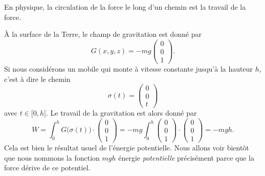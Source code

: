En physique, la circulation de la force le long d'un chemin est la travail de la force.

\begin{example}
    À la surface de la Terre, le champ de gravitation est donné par
    \begin{equation}
        G(x,y,z)=-mg\begin{pmatrix}
            0    \\
            0    \\
            1
        \end{pmatrix}.
    \end{equation}
    Si nous considérons un mobile qui monte à vitesse constante jusqu'à la hauteur $h$, c'est à dire le chemin
    \begin{equation}
        \sigma(t)=\begin{pmatrix}
            0    \\
            0    \\
            t
        \end{pmatrix}
    \end{equation}
    avec $t\in\mathopen[ 0 , h \mathclose]$. Le travail de la gravitation est alors donné par
    \begin{equation}
        W=\int_0^hG\big( \sigma(t) \big)\cdot\begin{pmatrix}
            0    \\
            0    \\
            1
        \end{pmatrix}=
        -mg\int_0^h\begin{pmatrix}
            0    \\
            0    \\
            1
        \end{pmatrix}\cdot\begin{pmatrix}
            0    \\
            0    \\
            1
        \end{pmatrix}=-mgh.
    \end{equation}
    Cela est bien le résultat usuel de l'énergie potentielle. Nous allons voir bientôt que nous nommons la fonction $mgh$ énergie \emph{potentielle} précisément parce que la force dérive de ce potentiel.
\end{example}

